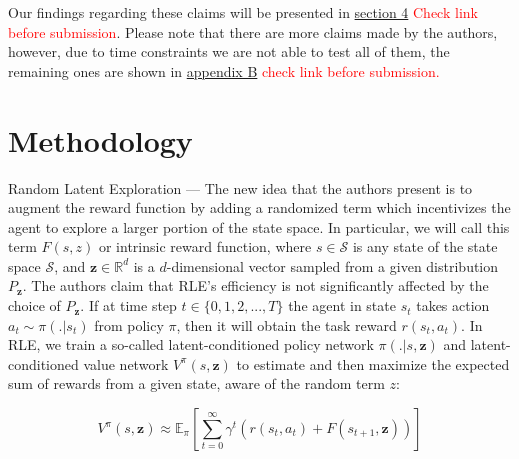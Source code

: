 \documentclass[10pt]{article} %
\begin{document}
\noindent Our findings regarding these claims will be presented in \hyperlink{sec4}{section 4} \textcolor{red}{Check link before submission}. Please note that there are more claims made by the authors, however, due to time constraints we are not able to test all of them, the remaining ones are shown in \hyperlink{untested-claims}{appendix B} \textcolor{red}{check link before submission.}

\section{Methodology}
Random Latent Exploration --- The new idea that the authors \cite{rle-paper} present is to augment the reward function by adding a randomized term which incentivizes the agent to explore a larger portion of the state space. In particular, we will call this term $F(s, z)$ or intrinsic reward function, where $s \in \mathcal{S}$ is any state of the state space $\mathcal{S}$, and $\textbf{z} \in \mathbb{R}^{d}$ is a $d$-dimensional vector sampled from a given distribution $P_{\textbf{z}}$. The authors \cite{rle-paper} claim that RLE's efficiency is not significantly affected by the choice of $P_{\textbf{z}}$. If at time step $t \in \{0, 1, 2, ..., T\}$ the agent in state $s_{t}$ takes action $a_{t} \sim \pi(. | s_{t})$ from policy $\pi$, then it will obtain the task reward $r (s_{t}, a_{t})$. In RLE, we train a so-called latent-conditioned policy network $\pi(. | s, \textbf{z})$ and latent-conditioned value network $V^{\pi}(s, \textbf{z})$ to estimate and then maximize the expected sum of rewards from a given state, aware of the random term $z$:

\begin{equation}
    V^{\pi}(s, \textbf{z}) \approx \mathbb{E}_{\pi} \left[\sum_{t = 0}^{\infty} \gamma^{t} \left(r(s_{t}, a_{t}) + F(s_{t+1}, \textbf{z})\right) \right]
    \label{eq:value_func}
\end{equation}
\end{document}
